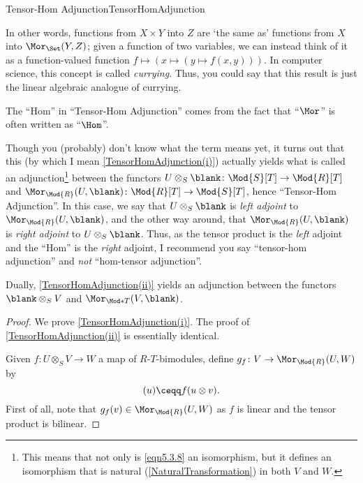 \begin{thm}{Tensor-Hom Adjunction}{TensorHomAdjunction}
\begin{rmk}
\begin{equation}
		\end{equation}
		In other words, functions from $X\times Y$ into $Z$ are `the same as' functions from $X$ into $\Mor _{\Set}(Y,Z)$; given a function of two variables, we can instead think of it as a function-valued function $f\mapsto (x\mapsto (y\mapsto f(x,y)))$.  In computer science, this concept is called \emph{currying}.  Thus, you could say that this result is just the linear algebraic analogue of currying.
	\end{rmk}
	\begin{rmk}
		The ``Hom'' in ``Tensor-Hom Adjunction'' comes from the fact that ``$\Mor$'' is often written as ``$\Hom$''.
	\end{rmk}
	\begin{rmk}
		Though you (probably) don't know what the term means yet, it turns out that this (by which I mean \cref{TensorHomAdjunction(i)}) actually yields what is called an adjunction\footnote{This means that not only is \eqref{eqn5.3.8} an isomorphism, but it defines an isomorphism that is natural (\cref{NaturalTransformation}) in both $V$ and $W$.} between the functors $U\otimes _S\blank \colon \Mod{S}[T]\rightarrow \Mod{R}[T]$ and $\Mor _{\Mod{R}}(U,\blank )\colon \Mod{R}[T]\rightarrow \Mod{S}[T]$, hence ``Tensor-Hom Adjunction''.  In this case, we say that $U\otimes _S\blank$ is \emph{left adjoint} to $\Mor _{\Mod{R}}(U,\blank )$, and the other way around, that $\Mor _{\Mod{R}}(U,\blank )$ is \emph{right adjoint} to $U\otimes _S\blank$.  Thus, as the tensor product is the \emph{left} adjoint and the ``Hom'' is the \emph{right} adjoint, I recommend you say ``tensor-hom adjunction'' and \emph{not} ``hom-tensor adjunction''.
		
		Dually, \cref{TensorHomAdjunction(ii)} yields an adjunction between the functors $\blank \otimes _SV$ and $\Mor _{\Mod*{T}}(V,\blank )$.
	\end{rmk}
	\begin{proof}
		We prove \cref{TensorHomAdjunction(i)}.  The proof of \cref{TensorHomAdjunction(ii)} is essentially identical.
		
		Given $f\colon U\otimes _SV\rightarrow W$ a map of $R$-$T$-bimodules, define $g_f\colon V\rightarrow \Mor _{\Mod{R}}(U,W)$ by
		\begin{equation}
			[g_f(v)](u)\ceqq f(u\otimes v).
		\end{equation}
		First of all, note that $g_f(v)\in \Mor _{\Mod{R}}(U,W)$ as $f$ is linear and the tensor product is bilinear.
		

\end{proof}
\end{thm}
